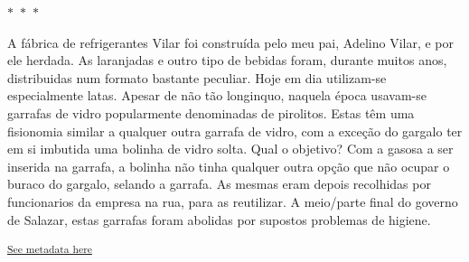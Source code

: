 \documentclass{article}
\begin{document}
 
    

    $\ast$~$\ast$~$\ast$  


    \begin{center}
        \begin{minipage}{0.9\textwidth}
            \setlength{\parskip}{0.2cm}
            \setlength{\parindent}{0cm}
            \fontsize{12pt}{14pt}\selectfont
            


A fábrica de refrigerantes Vilar foi construída pelo meu pai, Adelino Vilar, e por ele
herdada. As laranjadas e outro tipo de bebidas foram, durante muitos anos, distribuidas num
formato bastante peculiar. Hoje em dia utilizam-se especialmente
latas. Apesar de não tão longinquo, naquela época usavam-se garrafas de
vidro popularmente denominadas de pirolitos. Estas têm uma fisionomia
similar a qualquer outra garrafa de vidro, com a exceção do gargalo ter
em si imbutida uma bolinha de vidro solta. Qual o objetivo? Com a gasosa
a ser inserida na garrafa, a bolinha não tinha qualquer outra opção que
não ocupar o buraco do gargalo, selando a garrafa. As mesmas eram depois
recolhidas por funcionarios da empresa na rua, para as reutilizar. A
meio/parte final do governo de Salazar, estas garrafas foram abolidas
por supostos problemas de higiene.

        \end{minipage}
    \end{center}

    
        \textsuperscript{\hyperref[table:\arabic{tablecounter}]{See metadata here}}
    
\end{document}
